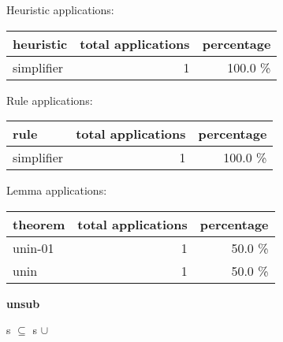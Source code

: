\documentclass[a4paper]{article}
\begin{document}
\medskip


Heuristic applications:

\begin{supertabular}{l|r|r}
heuristic	& total applications & percentage \\ \hline
simplifier & 1 & 100.0 \% \\

\end{supertabular}

Rule applications:

\begin{supertabular}{l|r|r}
rule	        & total applications & percentage \\ \hline
simplifier & 1 & 100.0 \% \\

\end{supertabular}

Lemma applications:

\begin{supertabular}{l|r|r}
theorem	        & total applications & percentage \\ \hline
unin-01 & 1 & 50.0 \% \\
unin & 1 & 50.0 \% \\

\end{supertabular}
\pagebreak

{\LARGE\bf unsub}\label{lemma-unsub}

\medskip

 \Fol s $\subseteq$ s $\cup$ 
\end{document}
